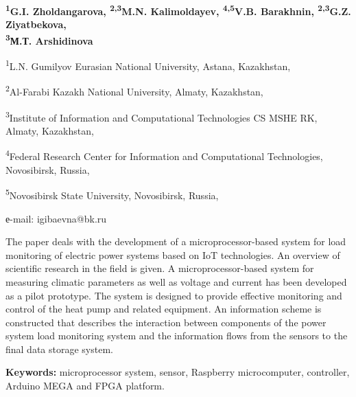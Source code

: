 \begin{center}
{\bfseries \textsuperscript{1}G.I. Zholdangarova, \textsuperscript{2,3}M.N.
Kalimoldayev, \textsuperscript{4,5}V.B. Barakhnin,
\textsuperscript{2,3}G.Z. Ziyatbekova\envelope,\\ \textsuperscript{3}М.Т. Arshidinova}

\textsuperscript{1}L.N. Gumilyov Eurasian National University, Astana,
Kazakhstan,

\textsuperscript{2}Al-Farabi Kazakh National University, Almaty,
Kazakhstan,

\textsuperscript{3}Institute of Information and Computational
Technologies CS MSHE RK, Almaty, Kazakhstan,

\textsuperscript{4}Federal Research Center for Information and
Computational Technologies, Novosibirsk, Russia,

\textsuperscript{5}Novosibirsk State University, Novosibirsk, Russia,

е-mail: igibaevna@bk.ru
\end{center}

The paper deals with the development of a microprocessor-based system
for load monitoring of electric power systems based on IoT technologies.
An overview of scientific research in the field is given. A
microprocessor-based system for measuring climatic parameters as well as
voltage and current has been developed as a pilot prototype. The system
is designed to provide effective monitoring and control of the heat pump
and related equipment. An information scheme is constructed that
describes the interaction between components of the power system load
monitoring system and the information flows from the sensors to the
final data storage system.

{\bfseries Keywords:} microprocessor system, sensor, Raspberry
microcomputer, controller, Arduino MEGA and FPGA platform.



